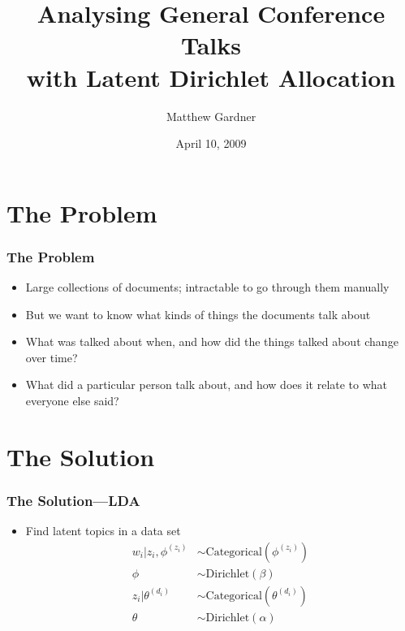 \documentclass{beamer}
\author{Matthew Gardner}
\title{Analysing General Conference Talks \\ with Latent Dirichlet Allocation}
\date{April 10, 2009}
\begin{document}
\begin{frame}
  \titlepage
\end{frame}

\section{The Problem}


\begin{frame}
  \frametitle{The Problem}
  \begin{itemize}
	\item Large collections of documents; intractable to go through them
	  manually
	  \pause
	\item But we want to know what kinds of things the documents talk about
	  \pause
	\item What was talked about when, and how did the things talked about
	  change over time?
	  \pause
	\item What did a particular person talk about, and how does it relate to
	  what everyone else said?
  \end{itemize}
\end{frame}

\section{The Solution}

\begin{frame}
  \frametitle{The Solution---LDA}
  \begin{itemize}
	\item Find latent topics in a data set
	  \begin{align*} 
		w_i|z_i,\phi^{(z_i)} &\sim \mathrm{Categorical}(\phi^{(z_i)}) \\
		\phi &\sim \mathrm{Dirichlet}(\beta) \\
		z_i|\theta^{(d_i)} &\sim \mathrm{Categorical}(\theta^{(d_i)}) \\ 
		\theta &\sim \mathrm{Dirichlet}(\alpha) 
	  \end{align*}
  \end{itemize}
\end{frame}
\end{document}
